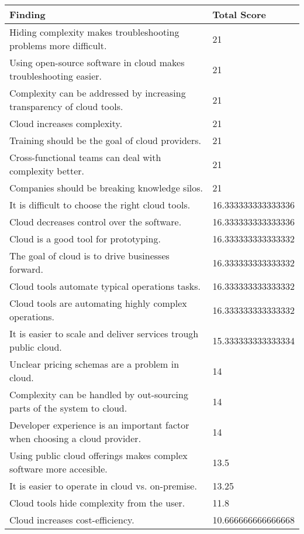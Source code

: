 
\renewcommand\arraystretch{1.5}%
\begin{longtable}{|p{10cm}|p{2cm}|}
\hline
\textbf{Finding}  & \textbf{Total Score} \\ \hline
\endhead
Hiding complexity makes troubleshooting problems more difficult. & 21 \\ \hline
Using open-source software in cloud makes troubleshooting easier. & 21 \\ \hline
Complexity can be addressed by increasing transparency of cloud tools. & 21 \\ \hline
Cloud increases complexity. & 21 \\ \hline
Training should be the goal of cloud providers. & 21 \\ \hline
Cross-functional teams can deal with complexity better. & 21 \\ \hline
Companies should be breaking knowledge silos. & 21 \\ \hline
It is difficult to choose the right cloud tools. & 16.333333333333336 \\ \hline
Cloud decreases control over the software. & 16.333333333333336 \\ \hline
Cloud is a good tool for prototyping. & 16.333333333333332 \\ \hline
The goal of cloud is to drive businesses forward. & 16.333333333333332 \\ \hline
Cloud tools automate typical operations tasks. & 16.333333333333332 \\ \hline
Cloud tools are automating highly complex operations. & 16.333333333333332 \\ \hline
It is easier to scale and deliver services trough public cloud. & 15.333333333333334 \\ \hline
Unclear pricing schemas are a problem in cloud. & 14 \\ \hline
Complexity can be handled by out-sourcing parts of the system to cloud. & 14 \\ \hline
Developer experience is an important factor when choosing a cloud provider. & 14 \\ \hline
Using public cloud offerings makes complex software more accesible. & 13.5 \\ \hline
It is easier to operate in cloud vs. on-premise. & 13.25 \\ \hline
Cloud tools hide complexity from the user. & 11.8 \\ \hline
Cloud increases cost-efficiency. & 10.666666666666668 \\ \hline

\end{longtable}
